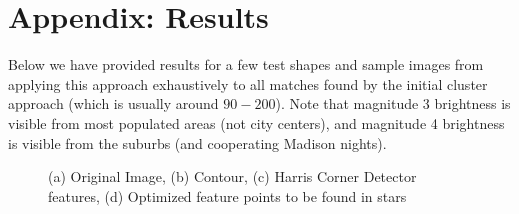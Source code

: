 \documentclass[paper=a4, fontsize=11pt]{scrartcl} %
\begin{document}




\section*{Appendix: Results}
Below we have provided results for a few test shapes and sample images from applying this approach exhaustively to all matches found by the initial cluster approach (which is usually around $90-200$). Note that magnitude 3 brightness is visible from most populated areas (not city centers), and magnitude 4 brightness is visible from the suburbs (and cooperating Madison nights). 

\begin{figure}[!h]
\caption{(a) Original Image, (b) Contour, (c) Harris Corner Detector features, (d) Optimized feature points to be found in stars}
\label{duck}
\end{figure}
\end{document}
